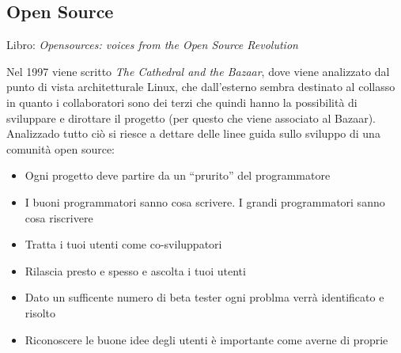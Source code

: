 \subsection{Open Source}

Libro: \textit{Opensources: voices from the Open Source Revolution}

Nel 1997 viene scritto \textit{The Cathedral and the Bazaar}, dove viene analizzato dal punto di vista architetturale Linux, che dall'esterno sembra destinato al collasso in quanto i collaboratori sono dei terzi che quindi hanno la possibilit\`a di sviluppare e dirottare il progetto (per questo che viene associato al Bazaar). Analizzado tutto ci\`o si riesce a dettare delle linee guida sullo sviluppo di una comunit\`a open source:
\begin{itemize}

\item Ogni progetto deve partire da un ``prurito'' del programmatore
\item I buoni programmatori sanno cosa scrivere. I grandi programmatori sanno cosa riscrivere
\item Tratta i tuoi utenti come co-sviluppatori
\item Rilascia presto e spesso e ascolta i tuoi utenti
\item Dato un sufficente numero di beta tester ogni problma verr\`a identificato e risolto
\item Riconoscere le buone idee degli utenti \`e importante come averne di proprie

\end{itemize}

